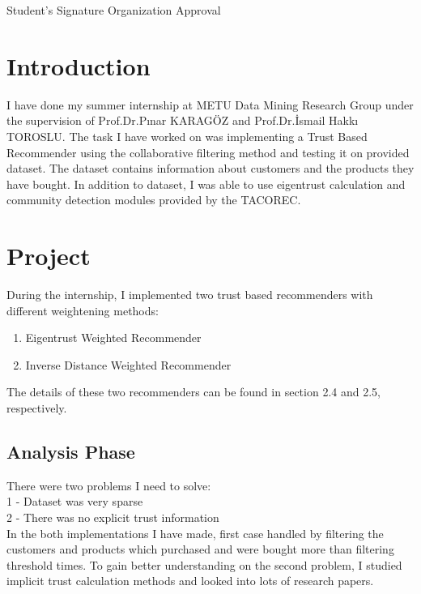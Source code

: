 \documentclass[12pt]{article}
\begin{document}
\begin{titlepage}
		
		Student's Signature \hspace{150px} Organization Approval \\
		
		
	\end{titlepage}
	
	
	\tableofcontents          
	\newpage
	
	\section{Introduction}
	I have done my summer internship at METU Data Mining Research Group under the supervision of Prof.Dr.Pınar KARAGÖZ and Prof.Dr.İsmail Hakkı TOROSLU. The task I have worked on was implementing a Trust Based Recommender using the collaborative filtering method and testing it on provided dataset. The dataset contains information about customers and the products they have bought. In addition to dataset, I was able to use eigentrust calculation and community detection modules provided by the TACOREC.
	
	\section{Project}
	During the internship, I implemented two trust based recommenders with different weightening methods:
	\begin{enumerate}
		\item Eigentrust Weighted Recommender
		\item Inverse Distance Weighted Recommender
	\end{enumerate} 
	The details of these two recommenders can be found in section 2.4 and 2.5, respectively.
	
	\subsection{Analysis Phase}
	There were two problems I need to solve: \\
	1 - Dataset was very sparse \\ 
	2 - There was no explicit trust information \\
	In the both implementations I have made, first case handled by filtering the customers and products which purchased and were bought more than filtering threshold times. To gain better understanding on the second problem, I studied implicit trust calculation methods and looked into lots of research papers.
	
\end{document}

